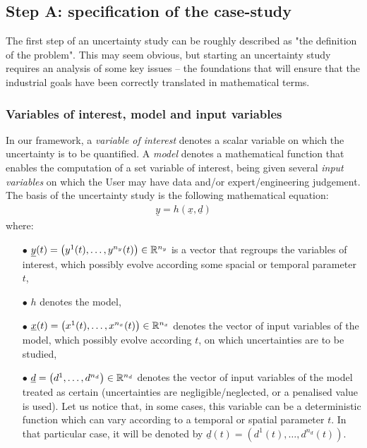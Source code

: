 \subsection{Step A: specification of the case-study}

The first step of an uncertainty study can be roughly described as "the definition of the problem". This may seem obvious, but starting an uncertainty study requires an analysis of some key issues -- the foundations that will ensure that the industrial goals have been correctly translated in mathematical terms.

\subsubsection{Variables of interest, model and input variables}

In our framework, a {\em variable of interest} denotes a scalar variable on which the uncertainty is to be quantified. A {\em model} denotes a mathematical function that enables the computation of a set variable of interest, being given several {\em input variables} on which the User may have data and/or expert/engineering judgement. The basis of the uncertainty study is the following mathematical equation:
\begin{align*}
  \underline{y} = h \left( \underline{x},\underline{d} \right)
\end{align*}
where:
\begin{itemize}
\item[$\bullet$] $\underline{y}(t) = \left( y^1(t),\ldots,y^{n_y}(t) \right) \in {\mathbb R}^{n_y}$ is a vector that regroups the variables of interest, which possibly evolve according some spacial or temporal parameter $t$,
\item[$\bullet$] $h$ denotes the model,
\item[$\bullet$] $\underline{x}(t) = \left( x^1(t),\ldots,x^{n_x}(t) \right) \in {\mathbb R}^{n_x}$ denotes the vector of input variables of the model, which possibly evolve according $t$, on which uncertainties are to be studied,
\item[$\bullet$] $\underline{d}= \left( d^1,\ldots,d^{n_d} \right) \in {\mathbb R}^{n_d}$ denotes the vector of input variables of the model treated as certain (uncertainties are negligible/neglected, or a penalised value is used). Let us notice that, in some cases, this variable can be a deterministic function which can vary according to a temporal or spatial parameter $t$. In that particular case, it will be denoted by $\underline{d}(t)= \left( d^1(t),\ldots,d^{n_d}(t) \right)$.
\end{itemize}

